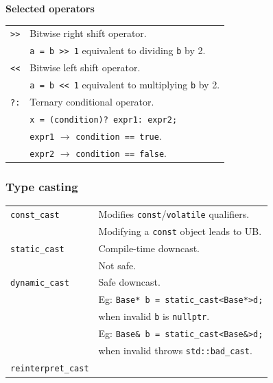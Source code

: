     \textbf{Selected operators}\\
    \begin{tabularx}{\linewidth}{lX}
        \texttt{>>} & Bitwise right shift operator.\\
                    & \texttt{a = b >> 1} equivalent to dividing \texttt{b} by 2.\\
        \texttt{<<} & Bitwise left shift operator.\\
                    & \texttt{a = b << 1} equivalent to multiplying \texttt{b} by 2.\\
        \texttt{?:} & Ternary conditional operator.\\
                    & \texttt{x = (condition)? expr1: expr2;}\\
                    & \texttt{expr1} $\to$ \texttt{condition == true}.\\
                    & \texttt{expr2} $\to$ \texttt{condition == false}.\\
    \end{tabularx}


\subsubsection{Type casting}

    \begin{tabularx}{\linewidth}{lX}
        \texttt{const\_cast}            & Modifies \texttt{const}/\texttt{volatile} qualifiers.\\
                                        & Modifying a \texttt{const} object leads to UB.\\
        \texttt{static\_cast}           & Compile-time downcast.\\
                                        & Not safe.\\
        \texttt{dynamic\_cast}          & Safe downcast.\\
                                        & Eg: \texttt{Base* b = static\_cast<Base*>d;} \\
                                        & when invalid \texttt{b} is \texttt{nullptr}.\\
                                        & Eg: \texttt{Base\& b = static\_cast<Base\&>d;} \\
                                        & when invalid throws \texttt{std::bad\_cast}.\\
        \texttt{reinterpret\_cast}      & \\
    \end{tabularx}

